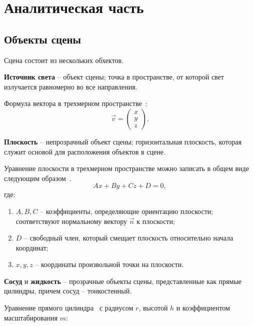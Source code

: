 \section{Аналитическая часть}

\subsection{Объекты сцены}\label{scene}

Сцена состоит из нескольких обхектов.

\textbf{Источник света} -- объект сцены; точка в пространстве, от которой свет излучается равномерно во все направления.

Формула вектора в трехмерном пространстве~\cite[с.~5--7]{beklemishev1984geometry}:
\begin{equation}
\vec{v} = \begin{pmatrix} x \\ y \\ z \end{pmatrix}.
\end{equation}

\textbf{Плоскость} -- непрозрачный объект сцены; горизонтальная плоскость, которая служит основой для расположения объектов в сцене.

Уравнение плоскости в трехмерном пространстве можно записать в общем виде следующим образом~\cite[с.~45]{beklemishev1984geometry}.
\begin{equation}
	Ax + By + Cz + D = 0,
\end{equation}\label{plane}
где: 

\begin{enumerate}[label=---]
	
	\item $A, B, C$ -- коэффициенты, определяющие ориентацию плоскости; соответствуют нормальному вектору $\vec{n}$ к плоскости;
	
	\item $D$ -- свободный член, который смещает плоскость относительно начала координат;
	
	\item $x, y, z$ -- координаты произвольной точки на плоскости.
	
\end{enumerate}


\textbf{Сосуд} и \textbf{жидкость} -- прозрачные объекты сцены, представленные как прямые цилиндры, причем сосуд -- тонкостенный.

Уравнение прямого цилиндра~\cite[с.~45]{beklemishev1984geometry} с радиусом $r$, высотой $h$ и коэффициентом масштабирования $m$:

